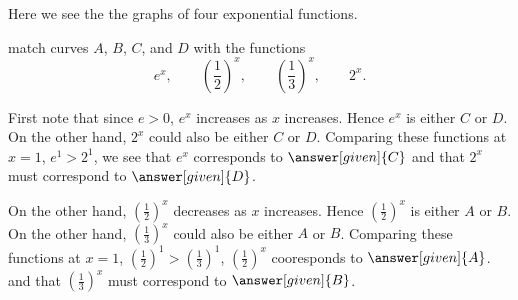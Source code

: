 \documentclass{ximera}
\begin{document}
\begin{example}
  Here we see the the graphs of four exponential functions.
  \begin{image}
  \end{image}
  match curves $A$, $B$, $C$, and $D$ with the functions
  \[
  e^x, \qquad \left(\frac{1}{2}\right)^{x}, \qquad  \left(\frac{1}{3}\right)^{x}, \qquad 2^{x}.
  \]
  \begin{explanation}
    First note that since $e> 0$, $e^x$ increases as $x$
    increases. Hence $e^x$ is either $C$ or $D$. On the other hand,
    $2^x$ could also be either $C$ or $D$.  Comparing these functions
    at $x=1$, $e^1 > 2^1$, we see that $e^x$ corresponds to
    $\answer[given]{C}$ and that $2^x$ must correspond to
    $\answer[given]{D}$.

    On the other hand, $\left(\frac{1}{2}\right)^{x}$ decreases as $x$
    increases. Hence $\left(\frac{1}{2}\right)^{x}$ is either $A$ or
    $B$. On the other hand, $\left(\frac{1}{3}\right)^{x}$ could also
    be either $A$ or $B$. Comparing these functions at $x=1$,
    $\left(\frac{1}{2}\right)^{1} >\left(\frac{1}{3}\right)^{1}$,
    $\left(\frac{1}{2}\right)^{x}$ cooresponds to $\answer[given]{A}$.
    and that $\left(\frac{1}{3}\right)^{x}$ must correspond to
    $\answer[given]{B}$.
  \end{explanation}
\end{example}
\end{document}
